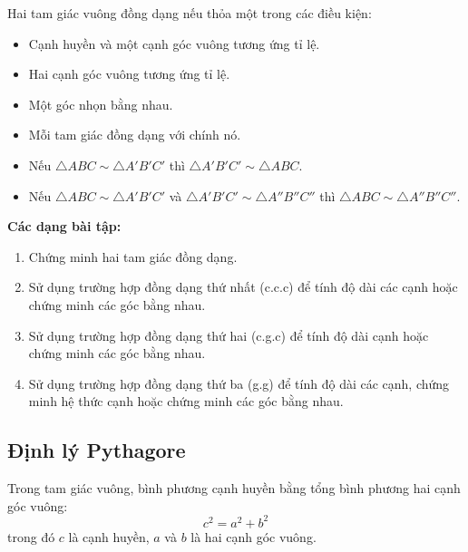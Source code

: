 \documentclass[12pt,a4paper]{article}
\begin{document}
\begin{dinhly}[title={Trường hợp đồng dạng của tam giác vuông}]
  Hai tam giác vuông đồng dạng nếu thỏa một trong các điều kiện:
  \begin{itemize}
    \item Cạnh huyền và một cạnh góc vuông tương ứng tỉ lệ.
    \item Hai cạnh góc vuông tương ứng tỉ lệ.
    \item Một góc nhọn bằng nhau.
  \end{itemize}
\end{dinhly}

\begin{tinhchat}
  \begin{itemize}
    \item Mỗi tam giác đồng dạng với chính nó.
    \item Nếu $\triangle ABC \sim \triangle A'B'C'$ thì $\triangle A'B'C' \sim \triangle ABC$.
    \item Nếu $\triangle ABC \sim \triangle A'B'C'$ và $\triangle A'B'C' \sim \triangle A''B''C''$ thì $\triangle ABC \sim \triangle A''B''C''$.
  \end{itemize}
\end{tinhchat}

\medskip\noindent\textbf{Các dạng bài tập:}
\begin{enumerate}[label=\textbf{Dạng \arabic*:}, leftmargin=*, align=left]
  \item Chứng minh hai tam giác đồng dạng.
  \item Sử dụng trường hợp đồng dạng thứ nhất (c.c.c) để tính độ dài các cạnh hoặc chứng minh các góc bằng nhau.
  \item Sử dụng trường hợp đồng dạng thứ hai (c.g.c) để tính độ dài cạnh hoặc chứng minh các góc bằng nhau.
  \item Sử dụng trường hợp đồng dạng thứ ba (g.g) để tính độ dài các cạnh, chứng minh hệ thức cạnh hoặc chứng minh các góc bằng nhau.
\end{enumerate}

\subsection{Định lý Pythagore}

\begin{dinhly}[title={Định lý Pythagore}]
  Trong tam giác vuông, bình phương cạnh huyền bằng tổng bình phương hai cạnh góc vuông:
  \[ c^2 = a^2 + b^2 \]
  trong đó $c$ là cạnh huyền, $a$ và $b$ là hai cạnh góc vuông.
\end{dinhly}
\end{document}
